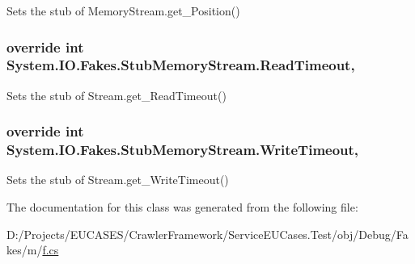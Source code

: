 Sets the stub of Memory\-Stream.\-get\-\_\-\-Position()

\hypertarget{class_system_1_1_i_o_1_1_fakes_1_1_stub_memory_stream_afdbda53fd5c02af1ab0627180fe4aa55}{
\subsubsection[{Read\-Timeout}]{\setlength{\rightskip}{0pt plus 5cm}override int System.\-I\-O.\-Fakes.\-Stub\-Memory\-Stream.\-Read\-Timeout\hspace{0.3cm}{\ttfamily [get]}, {\ttfamily [set]}}}\label{class_system_1_1_i_o_1_1_fakes_1_1_stub_memory_stream_afdbda53fd5c02af1ab0627180fe4aa55}


Sets the stub of Stream.\-get\-\_\-\-Read\-Timeout()

\hypertarget{class_system_1_1_i_o_1_1_fakes_1_1_stub_memory_stream_ac808be851e7c46527d5abbff8281b86c}{
\subsubsection[{Write\-Timeout}]{\setlength{\rightskip}{0pt plus 5cm}override int System.\-I\-O.\-Fakes.\-Stub\-Memory\-Stream.\-Write\-Timeout\hspace{0.3cm}{\ttfamily [get]}, {\ttfamily [set]}}}\label{class_system_1_1_i_o_1_1_fakes_1_1_stub_memory_stream_ac808be851e7c46527d5abbff8281b86c}


Sets the stub of Stream.\-get\-\_\-\-Write\-Timeout()



The documentation for this class was generated from the following file\-:\begin{DoxyCompactItemize}
\item 
D\-:/\-Projects/\-E\-U\-C\-A\-S\-E\-S/\-Crawler\-Framework/\-Service\-E\-U\-Cases.\-Test/obj/\-Debug/\-Fakes/m/\hyperlink{m_2f_8cs}{f.\-cs}\end{DoxyCompactItemize}
